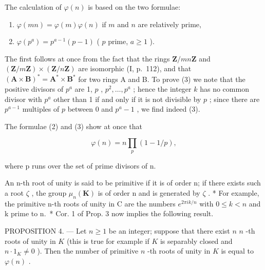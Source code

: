 The calculation of \(\varphi(n)\) is based on the two formulae:

\begin{enumerate}
\def\labelenumi{(\arabic{enumi})}
\setcounter{enumi}{1}
\item
  \(\varphi(mn) = \varphi(m)\varphi(n)\) if \(m\) and \(n\) are relatively prime,
\item
  \(\varphi(p^a) = p^{a-1}(p - 1)\) ( \(p\) prime, \(a \geqslant 1\) ).
\end{enumerate}

The first follows at once from the fact that the rings \(\mathbf{Z} / mn\mathbf{Z}\) and \((\mathbf{Z} / m\mathbf{Z}) \times (\mathbf{Z} / n\mathbf{Z})\) are isomorphic (I, p.~112), and that \((\mathbf{A} \times \mathbf{B})^{*} = \mathbf{A}^{*} \times \mathbf{B}^{*}\) for two rings A and B. To prove (3) we note that the positive divisors of \(p^{a}\) are 1, \(p\) , \(p^{2}, \ldots, p^{a}\) ; hence the integer \(k\) has no common divisor with \(p^{a}\) other than 1 if and only if it is not divisible by \(p\) ; since there are \(p^{a-1}\) multiples of \(p\) between 0 and \(p^{a}-1\) , we find indeed (3).

The formulae (2) and (3) show at once that

\[
\varphi (n) = n \prod_ {p} (1 - 1 / p),\tag{4}
\]

where p runs over the set of prime divisors of n.

An n-th root of unity is said to be primitive if it is of order n; if there exists such a root \(\zeta\) , the group \(\mu_{n}(\mathbf{K})\) is of order n and is generated by \(\zeta\) . * For example, the primitive n-th roots of unity in C are the numbers \(e^{2\pi ik/n}\) with \(0 \leqslant k < n\) and k prime to n.~* Cor. 1 of Prop. 3 now implies the following result.

PROPOSITION 4. --- Let \(n \geqslant 1\) be an integer; suppose that there exist \(n\) \(n\) -th roots of unity in \(K\) (this is true for example if \(K\) is separably closed and \(n \cdot 1_{K} \neq 0\) ). Then the number of primitive \(n\) -th roots of unity in \(K\) is equal to \(\varphi(n)\) .

